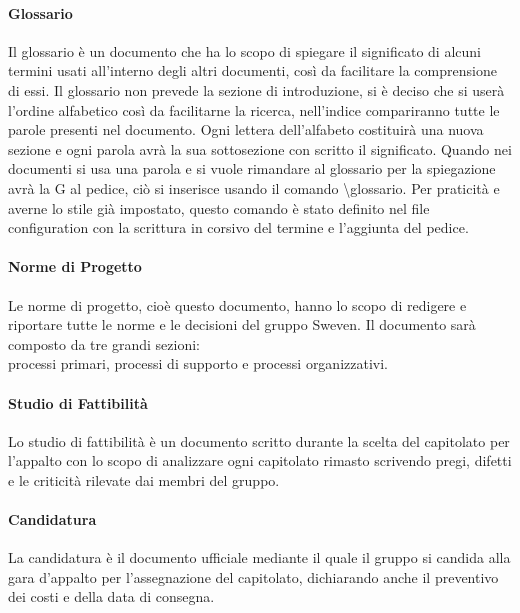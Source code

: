 \paragraph{Glossario}  \hfill \linebreak
Il glossario è un documento che ha lo scopo di spiegare il significato di alcuni termini usati 
all'interno degli altri documenti, così da facilitare la comprensione di essi. \newline
Il glossario non prevede la sezione di introduzione, si è deciso che si userà l'ordine alfabetico 
così da facilitarne la ricerca, nell'indice compariranno tutte le parole presenti nel documento. 
Ogni lettera dell'alfabeto costituirà una nuova sezione e ogni parola avrà la sua sottosezione 
con scritto il significato. \newline
Quando nei documenti si usa una parola e si vuole rimandare al glossario per la spiegazione 
avrà la G al pedice, ciò si inserisce usando il comando \textbackslash glossario. 
Per praticità e averne lo stile già impostato, questo comando è stato definito nel file 
configuration con la scrittura in corsivo del termine e l'aggiunta del pedice.

\paragraph{Norme di Progetto}  \hfill \break
Le norme di progetto, cioè questo documento, hanno lo scopo di redigere e riportare tutte le norme 
e le decisioni del gruppo Sweven. Il documento sarà composto da tre grandi sezioni: \\
processi primari, processi di supporto e processi organizzativi.

\paragraph{Studio di Fattibilità} \hfill \break
Lo studio di fattibilità è un documento scritto durante la scelta del capitolato per l'appalto con 
lo scopo di analizzare ogni capitolato rimasto scrivendo pregi, difetti e le criticità rilevate dai 
membri del gruppo.

\paragraph{Candidatura} \hfill \break
La candidatura è il documento ufficiale mediante il quale il gruppo si candida alla gara d'appalto 
per l'assegnazione del capitolato, dichiarando anche il preventivo dei costi e della data di consegna.

